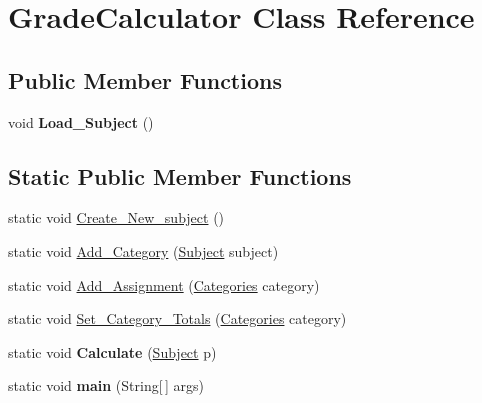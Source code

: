 \hypertarget{class_grade_calculator}{\section{Grade\-Calculator Class Reference}
\label{class_grade_calculator}
}
\subsection*{Public Member Functions}
\begin{DoxyCompactItemize}
\item 
\hypertarget{class_grade_calculator_ac2cfac715d7f710fe18448644db3c659}{void {\bfseries Load\-\_\-\-Subject} ()}\label{class_grade_calculator_ac2cfac715d7f710fe18448644db3c659}

\end{DoxyCompactItemize}
\subsection*{Static Public Member Functions}
\begin{DoxyCompactItemize}
\item 
static void \hyperlink{class_grade_calculator_ae69f6747270bbdc4c1e3daf867a291dc}{Create\-\_\-\-New\-\_\-subject} ()
\item 
static void \hyperlink{class_grade_calculator_a7adea4f13a161eff0f5d9a56d249732c}{Add\-\_\-\-Category} (\hyperlink{class_subject}{Subject} subject)
\item 
static void \hyperlink{class_grade_calculator_aae4ed0d68226ea4029173f7a5820fe14}{Add\-\_\-\-Assignment} (\hyperlink{class_categories}{Categories} category)
\item 
static void \hyperlink{class_grade_calculator_aa82321af81fd8f66f1734ae91122bf3c}{Set\-\_\-\-Category\-\_\-\-Totals} (\hyperlink{class_categories}{Categories} category)
\item 
\hypertarget{class_grade_calculator_afe40f60d6f402e1566c0d79e8193d6e7}{static void {\bfseries Calculate} (\hyperlink{class_subject}{Subject} p)}\label{class_grade_calculator_afe40f60d6f402e1566c0d79e8193d6e7}

\item 
\hypertarget{class_grade_calculator_a45b5c06a17a36c07a37cbb5669e96568}{static void {\bfseries main} (String\mbox{[}$\,$\mbox{]} args)}\label{class_grade_calculator_a45b5c06a17a36c07a37cbb5669e96568}

\end{DoxyCompactItemize}



